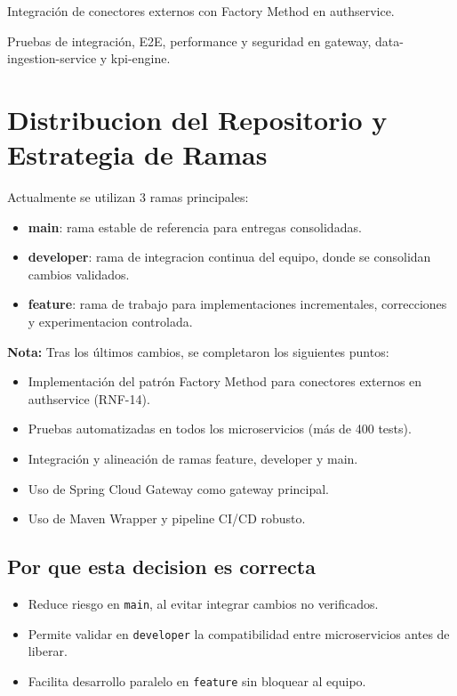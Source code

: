 \documentclass[12pt,a4paper]{article}
\begin{document}
    \item Integración de conectores externos con Factory Method en authservice.
    \item Pruebas de integración, E2E, performance y seguridad en gateway, data-ingestion-service y kpi-engine.
\section{Distribucion del Repositorio y Estrategia de Ramas}
Actualmente se utilizan 3 ramas principales:
\begin{itemize}[leftmargin=*]
    \item \textbf{main}: rama estable de referencia para entregas consolidadas.
    \item \textbf{developer}: rama de integracion continua del equipo, donde se consolidan cambios validados.
    \item \textbf{feature}: rama de trabajo para implementaciones incrementales, correcciones y experimentacion controlada.
\end{itemize}
\textbf{Nota:} Tras los últimos cambios, se completaron los siguientes puntos:
\begin{itemize}[leftmargin=*]
    \item Implementación del patrón Factory Method para conectores externos en authservice (RNF-14).
    \item Pruebas automatizadas en todos los microservicios (más de 400 tests).
    \item Integración y alineación de ramas feature, developer y main.
    \item Uso de Spring Cloud Gateway como gateway principal.
    \item Uso de Maven Wrapper y pipeline CI/CD robusto.
\end{itemize}

\subsection{Por que esta decision es correcta}
\begin{itemize}[leftmargin=*]
    \item Reduce riesgo en \texttt{main}, al evitar integrar cambios no verificados.
    \item Permite validar en \texttt{developer} la compatibilidad entre microservicios antes de liberar.
    \item Facilita desarrollo paralelo en \texttt{feature} sin bloquear al equipo.
\end{itemize}
\end{document}
